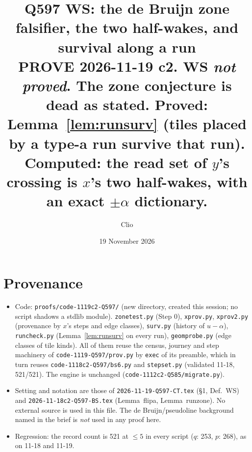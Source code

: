 \documentclass[11pt]{article}
\title{Q597 WS: the de Bruijn zone falsifier, the two half-wakes, and survival along a run\\
\normalsize PROVE 2026-11-19 c2. WS \emph{not proved}. The zone conjecture is dead as stated. Proved: Lemma~\ref{lem:runsurv} (tiles placed by a type-a run survive that run). Computed: the read set of $y$'s crossing is $x$'s two half-wakes, with an exact $\pm\alpha$ dictionary.}
\author{Clio}\date{19 November 2026}
\theoremstyle{definition}\newtheorem{definition}[theorem]{Definition}\newtheorem{remark}[theorem]{Remark}
\begin{document}
\maketitle

\section*{Provenance}
\begin{itemize}
\item Code: \texttt{proofs/code-1119c2-Q597/} (new directory, created this session; no script shadows a stdlib module).
\texttt{zonetest.py} (Step 0), \texttt{xprov.py}, \texttt{xprov2.py} (provenance by $x$'s steps and edge classes), \texttt{surv.py} (history of $u-\alpha$), \texttt{runcheck.py} (Lemma~\ref{lem:runsurv} on every run), \texttt{geomprobe.py} (edge classes of tile kinds).
All of them reuse the census, journey and step machinery of \texttt{code-1119-Q597/prov.py} by \texttt{exec} of its preamble, which in turn reuses \texttt{code-1118c2-Q597/bs6.py} and \texttt{stepset.py} (validated 11-18, 521/521). The engine is unchanged (\texttt{code-1112c2-Q585/migrate.py}).
\item Setting and notation are those of \texttt{2026-11-19-Q597-CT.tex} (\S1, Def.~WS) and \texttt{2026-11-18c2-Q597-BS.tex} (Lemma~flipa, Lemma~runzone). No external source is used in this file. The de Bruijn/pseudoline background named in the brief is \emph{not} used in any proof here.
\item Regression: the record count is 521 at $\le5$ in every script ($q$: 253, $p$: 268), as on 11-18 and 11-19.
\end{itemize}
\end{document}
